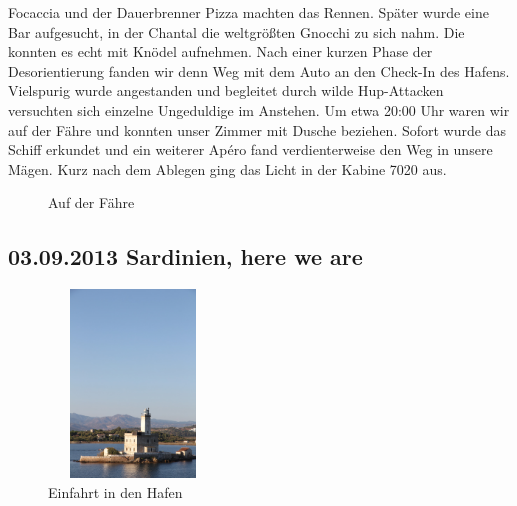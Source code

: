 Focaccia und der Dauerbrenner Pizza machten das Rennen.
Später wurde eine Bar aufgesucht, in der Chantal die weltgrößten Gnocchi zu sich nahm.
Die konnten es echt mit Knödel aufnehmen.
Nach einer kurzen Phase der Desorientierung fanden wir denn Weg mit dem Auto an den Check-In des Hafens.
Vielspurig wurde angestanden und begleitet durch wilde Hup-Attacken versuchten sich einzelne Ungeduldige im Anstehen.
Um etwa 20:00 Uhr waren wir auf der Fähre und konnten unser Zimmer mit Dusche beziehen.
Sofort wurde das Schiff erkundet und ein weiterer Apéro fand verdienterweise den Weg in unsere Mägen.
Kurz nach dem Ablegen ging das Licht in der Kabine 7020 aus.  

\begin{figure}[h]
   \centering
   \quad
   \quad
   \quad
   \caption[Auf der Fähre]{Auf der Fähre}
\end{figure}

\newpage

\subsection{03.09.2013 Sardinien, here we are} 

\begin{figure} 
  \begin{centering}
    \includegraphics[width=0.4\textwidth, height=5cm, keepaspectratio]{../Bilder/Sardinien/7.jpg}
    \caption{Einfahrt in den Hafen}
  \end{centering}
\end{figure} 

